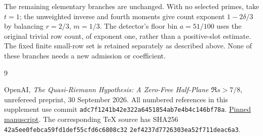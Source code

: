 The remaining elementary branches are unchanged. With no selected
primes, take $t=1$; the unweighted inverse and fourth moments give
count exponent $1-2\delta/3$ by balancing $r=2/3$, $m=1/3$.
The detector's floor bin $a=51/100$ uses the original trivial row
count, of exponent one, rather than a positive-slot estimate.
The fixed finite small-row set is retained separately as described
above. None of these branches needs a new admission or coefficient.

\begin{thebibliography}{9}
\raggedright
OpenAI,
\emph{The Quasi-Riemann Hypothesis: A Zero-Free Half-Plane
$\Re s>7/8$}, unrefereed preprint, 30 September 2026.
All numbered references in this supplement use commit
\texttt{adc7f1241b42e322a6451854ab7e4b4c146bf78a}.
\href{https://github.com/openai/math/blob/adc7f1241b42e322a6451854ab7e4b4c146bf78a/preprints/The-Quasi-Riemann-Hypothesis-September-30-2026/paper.pdf}
{Pinned manuscript}.
The corresponding TeX source has SHA256
\texttt{42a5ee0febca59fd1def55cfd6c6808c32}\allowbreak
\texttt{2ef4237d7726303ea52f711deac6a3}.
\end{thebibliography}

